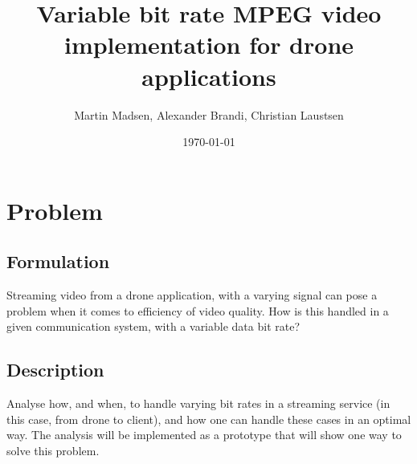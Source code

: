 \documentclass{article}
\title{Variable bit rate MPEG video implementation for drone applications}
\author{Martin Madsen, Alexander Brandi, Christian Laustsen}
\date{\today}
\begin{document}
\maketitle

\section{Problem}
\subsection{Formulation}
Streaming video from a drone application, with a varying signal can pose a problem when it comes to efficiency of video quality. How is this handled in a given communication system, with a variable data bit rate?


\subsection{Description}
Analyse how, and when, to handle varying bit rates in a streaming service (in this case, from drone to client), and how one can handle these cases in an optimal way. The analysis will be implemented as a prototype that will show one way to solve this problem.
\end{document}
